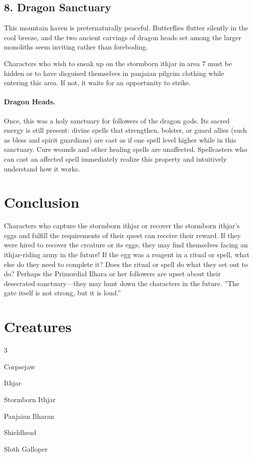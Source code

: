 \documentclass[10pt,a4paper,twoside,twocolumn,openany,bg=print,nodeprecatedcode]{dndbook}
\begin{document}
\subsection{8. Dragon Sanctuary}
\begin{DndReadAloud}{}
This mountain haven is preternaturally peaceful. Butterflies flutter silently in the cool breeze, and the two ancient carvings of dragon heads set among the larger monoliths seem inviting rather than foreboding.
\end{DndReadAloud}

Characters who wish to sneak up on the stormborn ithjar in area 7 must be hidden or to have disguised themselves in panjaian pilgrim clothing while entering this area. If not, it waits for an opportunity to strike.
\paragraph{Dragon Heads.}
Once, this was a holy sanctuary for followers of the dragon gods. Its sacred energy is still present: divine spells that strengthen, bolster, or guard allies (such as bless and spirit guardians) are cast as if one spell level higher while in this sanctuary. Cure wounds and other healing spells are unaffected. Spellcasters who can cast an affected spell immediately realize this property and intuitively understand how it works.
\section{Conclusion}
Characters who capture the stormborn ithjar or recover the stormborn ithjar's eggs and fulfill the requirements of their quest can receive their reward. If they were hired to recover the creature or its eggs, they may find themselves facing an ithjar-riding army in the future! If the egg was a reagent in a ritual or spell, what else do they need to complete it? Does the ritual or spell do what they set out to do? Perhaps the Primordial Ilhara or her followers are upset about their desecrated sanctuary—they may hunt down the characters in the future.
\DndQuote%
{}
{''The gate itself is not strong, but it is loud.''}
{}
\section{Creatures}

\begin{itemize}
\begin{multicols}{3}
\item Corpsejaw
\item Ithjar
\item Stormborn Ithjar
\item Panjaian Ilharan
\item Shieldhead
\item Sloth Galloper
\end{multicols}

\end{itemize}
\end{document}
